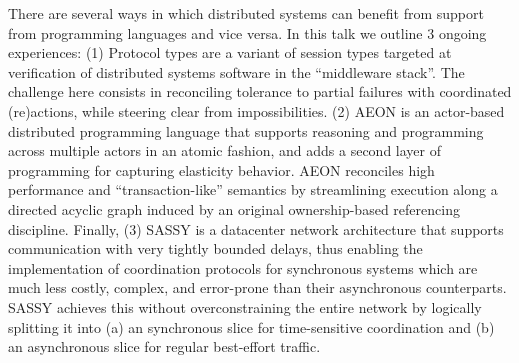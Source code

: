 There are several ways in which distributed systems can benefit from support from programming languages and vice versa. In this talk we outline 3 ongoing experiences: (1) Protocol types are a variant of session types targeted at verification of distributed systems software in the “middleware stack”. The challenge here consists in reconciling tolerance to partial failures with coordinated (re)actions, while steering clear from impossibilities. (2) AEON is an actor-based distributed programming language that supports reasoning and programming across multiple actors in an atomic fashion, and adds a second layer of programming for capturing elasticity behavior. AEON reconciles high performance and “transaction-like” semantics by streamlining execution along a directed acyclic graph induced by an original ownership-based referencing discipline. Finally, (3) SASSY is a datacenter network architecture that supports communication with very tightly bounded delays, thus enabling the implementation of coordination protocols for synchronous systems which are much less costly, complex, and error-prone than their asynchronous counterparts. SASSY achieves this without overconstraining the entire network by logically splitting it into (a) an synchronous slice for time-sensitive coordination and (b) an asynchronous slice for regular best-effort traffic.